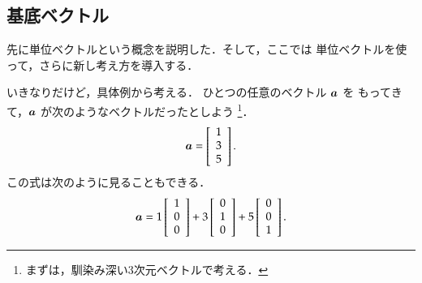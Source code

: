             \subsection{基底ベクトル}
                先に単位ベクトルという概念を説明した．そして，ここでは
                単位ベクトルを使って，さらに新し考え方を導入する．

                いきなりだけど，具体例から考える．
                ひとつの任意のベクトル $\boldsymbol{a}$ を
                もってきて，$\boldsymbol{a}$ が次のようなベクトルだったとしよう
                    \footnote{
                        まずは，馴染み深い3次元ベクトルで考える．
                    }．
                    \begin{equation*}
                        \boldsymbol{a}
                        =
                        \left[
                            \begin{array}{c}
                                1 \\
                                3 \\
                                5 \\
                            \end{array}
                        \right].
                    \end{equation*}
                この式は次のように見ることもできる．
                    \begin{equation*}
                        \boldsymbol{a}
                        =
                        1\left[
                            \begin{array}{c}
                                1 \\
                                0 \\
                                0 \\
                            \end{array}
                        \right]
                        +
                        3\left[
                            \begin{array}{c}
                                0 \\
                                1 \\
                                0 \\
                            \end{array}
                        \right]
                        +
                        5\left[
                            \begin{array}{c}
                                0 \\
                                0 \\
                                1 \\
                            \end{array}
                        \right].
                    \end{equation*}
